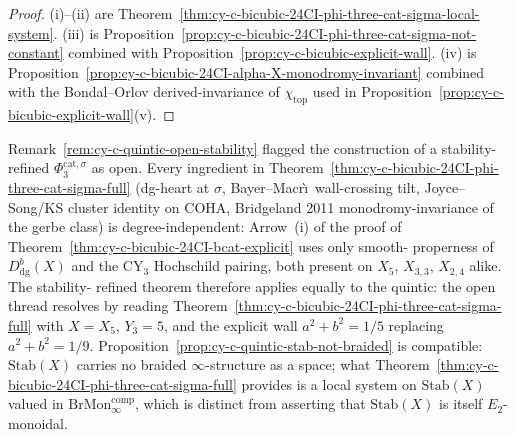\begin{proof}
(i)--(ii) are
Theorem~\ref{thm:cy-c-bicubic-24CI-phi-three-cat-sigma-local-system}.
(iii) is
Proposition~\ref{prop:cy-c-bicubic-24CI-phi-three-cat-sigma-not-constant}
combined with
Proposition~\ref{prop:cy-c-bicubic-explicit-wall}. (iv) is
Proposition~\ref{prop:cy-c-bicubic-24CI-alpha-X-monodromy-invariant}
combined with the Bondal--Orlov derived-invariance of $\chi_{\mathrm{top}}$
used in Proposition~\ref{prop:cy-c-bicubic-explicit-wall}(v).
\end{proof}

\begin{remark}
\label{rem:cy-c-bicubic-24CI-resolves-quintic-open}
Remark~\ref{rem:cy-c-quintic-open-stability} flagged the construction
of a stability-refined $\Phi_3^{\mathrm{cat},\sigma}$ as open. Every
ingredient in
Theorem~\ref{thm:cy-c-bicubic-24CI-phi-three-cat-sigma-full} (dg-heart
at $\sigma$, Bayer--Macr\`\i\ wall-crossing tilt, Joyce--Song/KS
cluster identity on COHA, Bridgeland 2011 monodromy-invariance of the
gerbe class) is degree-independent: Arrow~(i) of the proof of
Theorem~\ref{thm:cy-c-bicubic-24CI-bcat-explicit} uses only smooth-
properness of $D^b_{\mathrm{dg}}(X)$ and the CY$_3$ Hochschild pairing,
both present on $X_5$, $X_{3,3}$, $X_{2,4}$ alike. The stability-
refined theorem therefore applies equally to the quintic: the open
thread resolves by reading
Theorem~\ref{thm:cy-c-bicubic-24CI-phi-three-cat-sigma-full} with
$X = X_5$, $Y_3 = 5$, and the explicit wall
$a^2 + b^2 = 1/5$ replacing $a^2 + b^2 = 1/9$.
Proposition~\ref{prop:cy-c-quintic-stab-not-braided} is compatible:
$\mathrm{Stab}(X)$ carries no braided $\infty$-structure as a space;
what
Theorem~\ref{thm:cy-c-bicubic-24CI-phi-three-cat-sigma-full} provides
is a local system on $\mathrm{Stab}(X)$ valued in
$\mathrm{BrMon}^{\mathrm{comp}}_\infty$, which is distinct from
asserting that $\mathrm{Stab}(X)$ is itself $E_2$-monoidal.
\end{remark}

